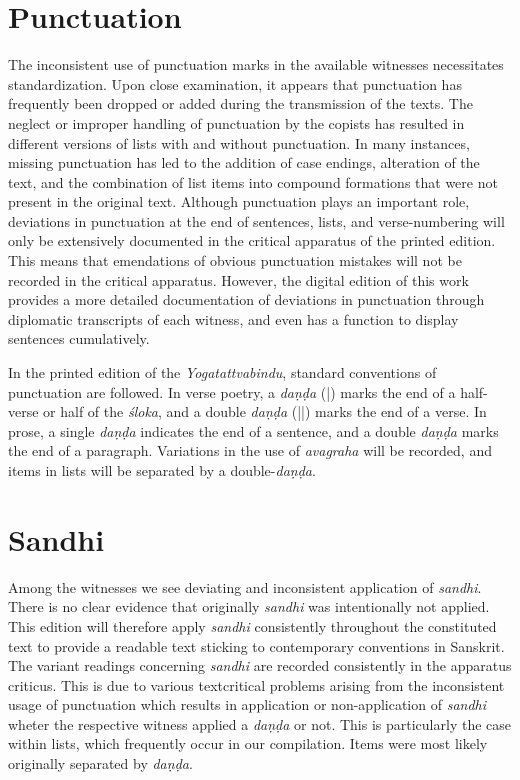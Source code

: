 \section{Punctuation}

The inconsistent use of punctuation marks in the available witnesses necessitates standardization. Upon close examination, it appears that punctuation has frequently been dropped or added during the transmission of the texts. The neglect or improper handling of punctuation by the copists has resulted in different versions of lists with and without punctuation. In many instances, missing punctuation has led to the addition of case endings, alteration of the text, and the combination of list items into compound formations that were not present in the original text. Although punctuation plays an important role, deviations in punctuation at the end of sentences, lists, and verse-numbering will only be extensively documented in the critical apparatus of the printed edition. This means that emendations of obvious punctuation mistakes will not be recorded in the critical apparatus. However, the digital edition of this work provides a more detailed documentation of deviations in punctuation through diplomatic transcripts of each witness, and even has a function to display sentences cumulatively.

In the printed edition of the \textit{Yogatattvabindu}, standard conventions of punctuation are followed. In verse poetry, a \textit{daṇḍa} (|) marks the end of a half-verse or half of the \textit{śloka}, and a double \textit{daṇḍa} (||) marks the end of a verse. In prose, a single \textit{daṇḍa} indicates the end of a sentence, and a double \textit{daṇḍa} marks the end of a paragraph. Variations in the use of \textit{avagraha} will be recorded, and items in lists will be separated by a double-\textit{daṇḍa}.

\section{Sandhi}

Among the witnesses we see deviating and inconsistent application of \textit{sandhi}. There is no clear evidence that originally \textit{sandhi} was intentionally not applied. This edition will therefore apply \textit{sandhi} consistently throughout the constituted text to provide a readable text sticking to contemporary conventions in Sanskrit. The variant readings concerning \textit{sandhi} are recorded consistently in the apparatus criticus. This is due to various textcritical problems arising from the inconsistent usage of punctuation which results in application or non-application of \textit{sandhi} wheter the respective witness applied a \textit{daṇḍa} or not. This is particularly the case within lists, which frequently occur in our compilation. Items were most likely originally separated by \textit{daṇḍa}. 


